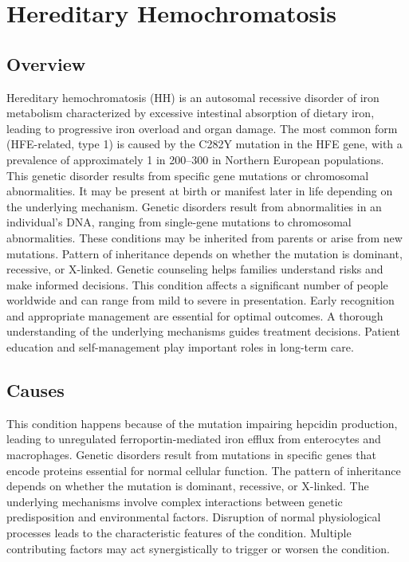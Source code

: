 \chapter{Hereditary Hemochromatosis}
\label{sec:nutrition:Hereditary Hemochromatosis}

\section{Overview}
Hereditary hemochromatosis (HH) is an autosomal recessive disorder of iron metabolism characterized by excessive intestinal absorption of dietary iron, leading to progressive iron overload and organ damage. The most common form (HFE-related, type 1) is caused by the C282Y mutation in the HFE gene, with a prevalence of approximately 1 in 200--300 in Northern European populations. This genetic disorder results from specific gene mutations or chromosomal abnormalities. It may be present at birth or manifest later in life depending on the underlying mechanism. Genetic disorders result from abnormalities in an individual's DNA, ranging from single-gene mutations to chromosomal abnormalities. These conditions may be inherited from parents or arise from new mutations. Pattern of inheritance depends on whether the mutation is dominant, recessive, or X-linked. Genetic counseling helps families understand risks and make informed decisions. This condition affects a significant number of people worldwide and can range from mild to severe in presentation. Early recognition and appropriate management are essential for optimal outcomes. A thorough understanding of the underlying mechanisms guides treatment decisions. Patient education and self-management play important roles in long-term care.
\section{Causes}
This condition happens because of the mutation impairing hepcidin production, leading to unregulated ferroportin-mediated iron efflux from enterocytes and macrophages. Genetic disorders result from mutations in specific genes that encode proteins essential for normal cellular function. The pattern of inheritance depends on whether the mutation is dominant, recessive, or X-linked. The underlying mechanisms involve complex interactions between genetic predisposition and environmental factors. Disruption of normal physiological processes leads to the characteristic features of the condition. Multiple contributing factors may act synergistically to trigger or worsen the condition.
